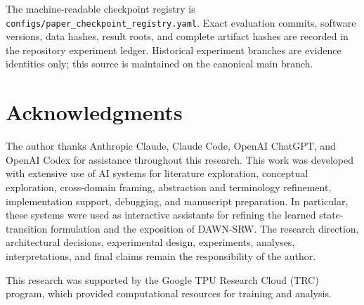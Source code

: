 \documentclass{article}
\newcommand{\DAWN}{DAWN-SRW}
\begin{document}
The machine-readable checkpoint registry is
\texttt{configs/paper\_checkpoint\_registry.yaml}. Exact evaluation commits,
software versions, data hashes, result roots, and complete artifact hashes are
recorded in the repository experiment ledger. Historical experiment branches
are evidence identities only; this source is maintained on the canonical main
branch.

\section*{Acknowledgments}

The author thanks Anthropic Claude, Claude Code, OpenAI ChatGPT, and OpenAI
Codex for assistance throughout this research. This work was developed with
extensive use of AI systems for literature exploration, conceptual exploration,
cross-domain framing, abstraction and terminology refinement, implementation
support, debugging, and manuscript preparation. In particular, these systems
were used as interactive assistants for refining the learned state-transition
formulation and the exposition of \DAWN{}. The research direction,
architectural decisions, experimental design, experiments, analyses,
interpretations, and final claims remain the responsibility of the author.

This research was supported by the Google TPU Research Cloud (TRC) program,
which provided computational resources for training and analysis.

\begingroup
\footnotesize
\setlength{\bibsep}{0pt}


\endgroup
\end{document}
